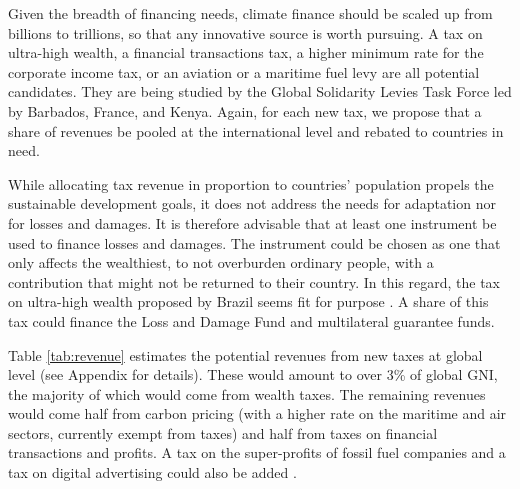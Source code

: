 \documentclass[12pt,english]{article}
\begin{document}
\begin{bibunit}
Given the breadth of financing needs, climate finance should be scaled up from billions to trillions, so that any innovative source is worth pursuing. A tax on ultra-high wealth, a financial transactions tax, a higher minimum rate for the corporate income tax, or an aviation or a maritime fuel levy are all potential candidates. They are being studied by the Global Solidarity Levies Task Force led by Barbados, France, and Kenya. Again, for each new tax, we propose that a share of revenues be pooled at the international level and rebated to countries in need. 

While allocating tax revenue in proportion to countries' population propels the sustainable development goals, it does not address the needs for adaptation nor for losses and damages. It is therefore advisable that at least one instrument be used to finance losses and damages. The instrument could be chosen as one that only affects the wealthiest, to not overburden ordinary people, with a contribution that might not be returned to their country. In this regard, the tax on ultra-high wealth proposed by Brazil seems fit for purpose \citep{zucman_blueprint_2024}. A share of this tax could finance the Loss and Damage Fund and multilateral guarantee funds. 

Table \ref{tab:revenue} estimates the potential revenues from new taxes at global level (see Appendix for details). These would amount to over 3\% of global GNI, the majority of which would come from wealth taxes. The remaining revenues would come half from carbon pricing (with a higher rate on the maritime and air sectors, currently exempt from taxes) and half from taxes on financial transactions and profits. A tax on the super-profits of fossil fuel companies and a tax on digital advertising could also be added \citep{acemoglu_urgent_2024}. 


\end{bibunit}
\end{document}
